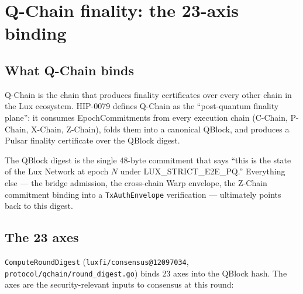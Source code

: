 \section{Q-Chain finality: the 23-axis binding}
\label{sec:qchain-finality}

\subsection{What Q-Chain binds}

Q-Chain is the chain that produces finality certificates over every other
chain in the Lux ecosystem. HIP-0079 defines Q-Chain as the
``post-quantum finality plane'': it consumes EpochCommitments from every
execution chain (C-Chain, P-Chain, X-Chain, Z-Chain), folds them into a
canonical QBlock, and produces a Pulsar finality certificate over the
QBlock digest.

The QBlock digest is the single 48-byte commitment that says ``this is the
state of the Lux Network at epoch $N$ under LUX\_STRICT\_E2E\_PQ.''
Everything else --- the bridge admission, the cross-chain Warp envelope, the
Z-Chain commitment binding into a \texttt{TxAuthEnvelope} verification ---
ultimately points back to this digest.

\subsection{The 23 axes}

\texttt{ComputeRoundDigest} (\texttt{luxfi/consensus@12097034},
\texttt{protocol/qchain/round\_digest.go}) binds 23 axes into the QBlock
hash. The axes are the security-relevant inputs to consensus at this round:

